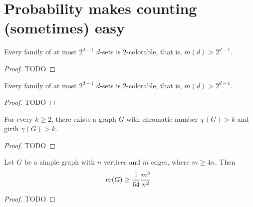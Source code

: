 \chapter{Probability makes counting (sometimes) easy}


\begin{theorem}
  \label{ch45theorem1}
  Every family of at most $2^{d-1}$ $d$-sets is $2$-colorable, that is,
  $m(d) > 2^{d-1}$.
\end{theorem}
\begin{proof}
  TODO
\end{proof}


\begin{theorem}
  \label{ch45theorem2}
  Every family of at most $2^{d-1}$ $d$-sets is $2$-colorable, that is,
$m(d) > 2^{d-1}$.
\end{theorem}
\begin{proof}
  TODO
\end{proof}

\begin{theorem}
  \label{ch45theorem3}
For every $k \geq 2$, there exists a graph $G$ with chromatic number $\chi(G) > k$ and
girth $\gamma(G) > k$.
\end{theorem}
\begin{proof}
  TODO
\end{proof}

\begin{theorem}
  \label{ch45theorem4}
  Let $G$ be a simple graph with $n$ vertices and $m$ edges, where $m \ge 4n$. Then
  \[
  \operatorname{cr}(G) \ge \frac{1}{64}\frac{m^3}{n^2}.
  \]
\end{theorem}
\begin{proof}
  TODO
\end{proof}
